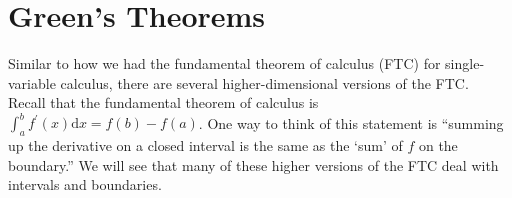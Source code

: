 \section{Green's Theorems}
\noindent
Similar to how we had the fundamental theorem of calculus (FTC) for single-variable calculus, there are several higher-dimensional versions of the FTC.\\
Recall that the fundamental theorem of calculus is $\int_{a}^{b}{f^\prime(x)\mathrm{d}x} = f(b) - f(a)$. One way to think of this statement is “summing up the derivative on a closed interval is the same as the ‘sum’ of $f$ on the boundary.” We will see that many of these higher versions of the FTC deal with intervals and boundaries.


